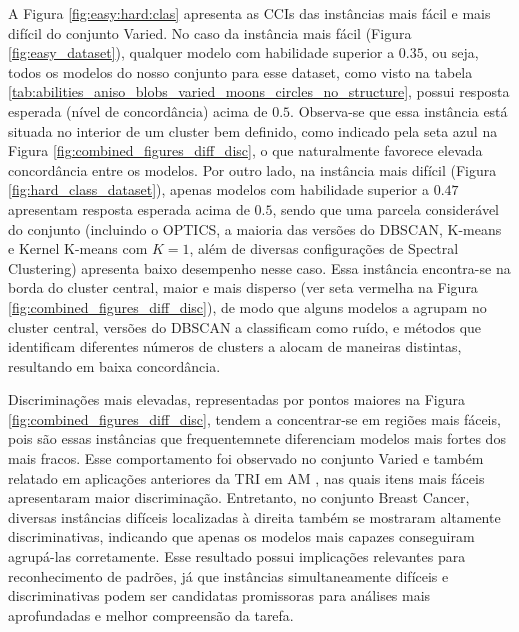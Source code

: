 A Figura \ref{fig:easy:hard:clas} apresenta as \gls{CCI}s das instâncias mais fácil e mais difícil do conjunto Varied. No caso da instância mais fácil (Figura \ref{fig:easy_dataset}), qualquer modelo com habilidade superior a $0.35$, ou seja, todos os modelos do nosso conjunto para esse dataset, como visto na tabela \ref{tab:abilities_aniso_blobs_varied_moons_circles_no_structure}, possui resposta esperada (nível de concordância) acima de $0.5$. Observa-se que essa instância está situada no interior de um cluster bem definido, como indicado pela seta azul na Figura \ref{fig:combined_figures_diff_disc}, o que naturalmente favorece elevada concordância entre os modelos. Por outro lado, na instância mais difícil (Figura \ref{fig:hard_class_dataset}), apenas modelos com habilidade superior a $0.47$ apresentam resposta esperada acima de $0.5$, sendo que uma parcela considerável do conjunto (incluindo o OPTICS, a maioria das versões do DBSCAN, K-means e Kernel K-means com $K=1$, além de diversas configurações de Spectral Clustering) apresenta baixo desempenho nesse caso. Essa instância encontra-se na borda do cluster central, maior e mais disperso (ver seta vermelha na Figura \ref{fig:combined_figures_diff_disc}), de modo que alguns modelos a agrupam no cluster central, versões do DBSCAN a classificam como ruído, e métodos que identificam diferentes números de clusters a alocam de maneiras distintas, resultando em baixa concordância.

Discriminações mais elevadas, representadas por pontos maiores na Figura \ref{fig:combined_figures_diff_disc}, tendem a concentrar-se em regiões mais fáceis, pois são essas instâncias que frequentemnete diferenciam modelos mais fortes dos mais fracos. Esse comportamento foi observado no conjunto Varied e também relatado em aplicações anteriores da \gls{TRI} em \gls{AM} \cite{chen2019birt,moraes2020item,moraes2022evaluating}, nas quais itens mais fáceis apresentaram maior discriminação. Entretanto, no conjunto Breast Cancer, diversas instâncias difíceis localizadas à direita também se mostraram altamente discriminativas, indicando que apenas os modelos mais capazes conseguiram agrupá-las corretamente. Esse resultado possui implicações relevantes para reconhecimento de padrões, já que instâncias simultaneamente difíceis e discriminativas podem ser candidatas promissoras para análises mais aprofundadas e melhor compreensão da tarefa.

